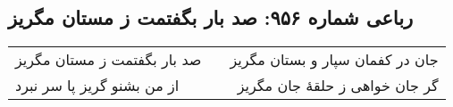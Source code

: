 \begin{center}
\section*{رباعی شماره ۹۵۶: صد بار بگفتمت ز مستان مگریز}
\label{sec:0956}
\begin{longtable}{l p{0.5cm} r}
صد بار بگفتمت ز مستان مگریز
&&
جان در کفمان سپار و بستان مگریز
\\
از من بشنو گریز پا سر نبرد
&&
گر جان خواهی ز حلقهٔ جان مگریز
\\
\end{longtable}
\end{center}
